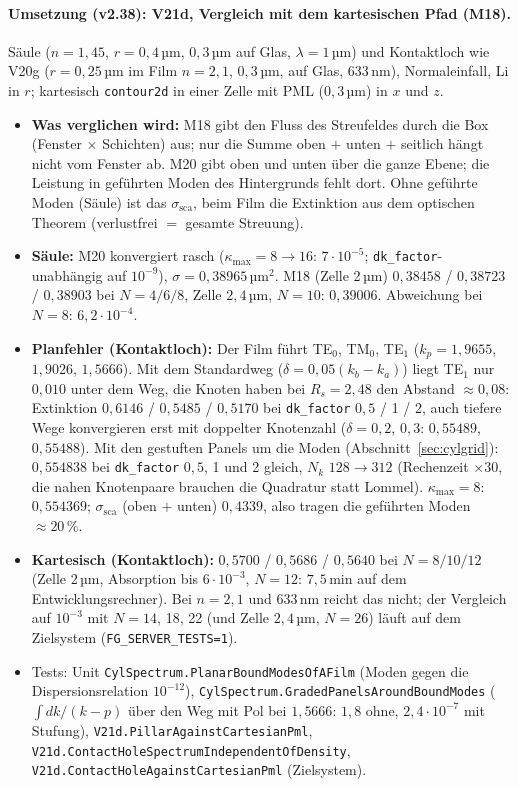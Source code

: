 \paragraph{Umsetzung (v2.38): V21d, Vergleich mit dem kartesischen Pfad (M18).}
Säule ($n=1{,}45$, $r=0{,}4$\,µm, $0{,}3$\,µm auf Glas, $\lambda=1$\,µm) und Kontaktloch wie V20g ($r=0{,}25$\,µm im Film
$n=2{,}1$, $0{,}3$\,µm, auf Glas, 633\,nm), Normaleinfall, Li in $r$; kartesisch \verb|contour2d| in einer Zelle mit PML
($0{,}3$\,µm) in $x$ und $z$.
\begin{itemize}[nosep]
  \item \textbf{Was verglichen wird:} M18 gibt den Fluss des Streufeldes durch die Box (Fenster $\times$ Schichten)
        aus; nur die Summe oben $+$ unten $+$ seitlich hängt nicht vom Fenster ab. M20 gibt oben und unten über die ganze
        Ebene; die Leistung in geführten Moden des Hintergrunds fehlt dort. Ohne geführte Moden (Säule) ist das
        $\sigma_{\text{sca}}$, beim Film die Extinktion aus dem optischen Theorem (verlustfrei $=$ gesamte Streuung).
  \item \textbf{Säule:} M20 konvergiert rasch ($\kappa_{\max}=8\to16$: $7\cdot10^{-5}$; \verb|dk_factor|-unabhängig auf
        $10^{-9}$), $\sigma=0{,}38965$\,µm$^2$. M18 (Zelle 2\,µm) $0{,}38458$ / $0{,}38723$ / $0{,}38903$ bei $N=4/6/8$,
        Zelle $2{,}4$\,µm, $N=10$: $0{,}39006$. Abweichung bei $N=8$: $6{,}2\cdot10^{-4}$.
  \item \textbf{Planfehler (Kontaktloch):} Der Film führt TE$_0$, TM$_0$, TE$_1$ ($k_p=1{,}9655$, $1{,}9026$, $1{,}5666$).
        Mit dem Standardweg ($\delta=0{,}05(k_b-k_a)$) liegt TE$_1$ nur $0{,}010$ unter dem Weg, die Knoten haben bei
        $R_s=2{,}48$ den Abstand $\approx0{,}08$: Extinktion $0{,}6146$ / $0{,}5485$ / $0{,}5170$ bei \verb|dk_factor|
        $0{,}5$ / 1 / 2, auch tiefere Wege konvergieren erst mit doppelter Knotenzahl ($\delta=0{,}2$, $0{,}3$:
        $0{,}55489$, $0{,}55488$). Mit den gestuften Panels um die Moden (Abschnitt~\ref{sec:cylgrid}): $0{,}554838$
        bei \verb|dk_factor| $0{,}5$, 1 und 2 gleich, $N_k$ $128\to312$ (Rechenzeit $\times30$, die nahen Knotenpaare
        brauchen die Quadratur statt Lommel). $\kappa_{\max}=8$: $0{,}554369$; $\sigma_{\text{sca}}$ (oben $+$ unten)
        $0{,}4339$, also tragen die geführten Moden $\approx20\,\%$.
  \item \textbf{Kartesisch (Kontaktloch):} $0{,}5700$ / $0{,}5686$ / $0{,}5640$ bei $N=8/10/12$ (Zelle 2\,µm, Absorption
        bis $6\cdot10^{-3}$, $N=12$: $7{,}5$\,min auf dem Entwicklungsrechner). Bei $n=2{,}1$ und 633\,nm reicht das nicht;
        der Vergleich auf $10^{-3}$ mit $N=14$, 18, 22 (und Zelle $2{,}4$\,µm, $N=26$) läuft auf dem Zielsystem
        (\verb|FG_SERVER_TESTS=1|).
  \item Tests: Unit \verb|CylSpectrum.PlanarBoundModesOfAFilm| (Moden gegen die Dispersionsrelation $10^{-12}$),
        \verb|CylSpectrum.GradedPanelsAroundBoundModes| ($\int dk/(k-p)$ über den Weg mit Pol bei $1{,}5666$: $1{,}8$ ohne, $2{,}4\cdot10^{-7}$ mit Stufung),
        \verb|V21d.PillarAgainstCartesianPml|, \verb|V21d.ContactHoleSpectrumIndependentOfDensity|,
        \verb|V21d.ContactHoleAgainstCartesianPml| (Zielsystem).
\end{itemize}

